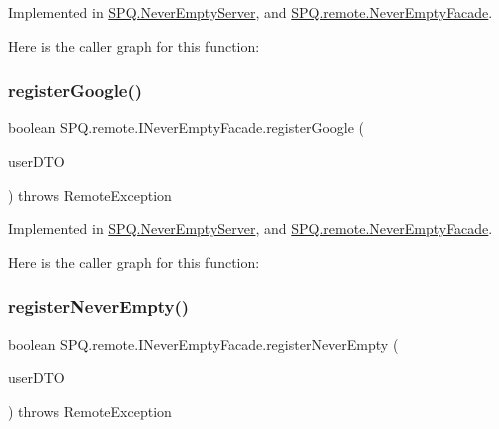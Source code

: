 Implemented in \mbox{\hyperlink{class_s_p_q_1_1_never_empty_server_abf7e271e0edb91e8f8ed73063de74b03}{S\+P\+Q.\+Never\+Empty\+Server}}, and \mbox{\hyperlink{class_s_p_q_1_1remote_1_1_never_empty_facade_aa9845001ecd5228135d64415a4c12b20}{S\+P\+Q.\+remote.\+Never\+Empty\+Facade}}.

Here is the caller graph for this function\+:
\mbox{\label{interface_s_p_q_1_1remote_1_1_i_never_empty_facade_a93f3250c09a26fdb1d65219599dfd542}} 
\subsubsection{\texorpdfstring{register\+Google()}{registerGoogle()}}
{\footnotesize\ttfamily boolean S\+P\+Q.\+remote.\+I\+Never\+Empty\+Facade.\+register\+Google (\begin{DoxyParamCaption}\item[{\mbox{\hyperlink{class_s_p_q_1_1dto_1_1_user_d_t_o}{User\+D\+TO}}}]{user\+D\+TO }\end{DoxyParamCaption}) throws Remote\+Exception}



Implemented in \mbox{\hyperlink{class_s_p_q_1_1_never_empty_server_ac97355451c02fc378cb5d8f33f442ce6}{S\+P\+Q.\+Never\+Empty\+Server}}, and \mbox{\hyperlink{class_s_p_q_1_1remote_1_1_never_empty_facade_aaa8d4a6148957029af068d00da24890b}{S\+P\+Q.\+remote.\+Never\+Empty\+Facade}}.

Here is the caller graph for this function\+:
\mbox{\label{interface_s_p_q_1_1remote_1_1_i_never_empty_facade_a7867e1e698fea32a535a1daeda4e8d6a}} 
\subsubsection{\texorpdfstring{register\+Never\+Empty()}{registerNeverEmpty()}}
{\footnotesize\ttfamily boolean S\+P\+Q.\+remote.\+I\+Never\+Empty\+Facade.\+register\+Never\+Empty (\begin{DoxyParamCaption}\item[{\mbox{\hyperlink{class_s_p_q_1_1dto_1_1_user_d_t_o}{User\+D\+TO}}}]{user\+D\+TO }\end{DoxyParamCaption}) throws Remote\+Exception}



